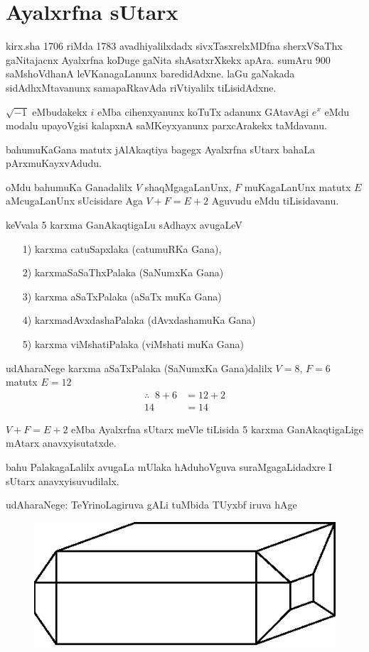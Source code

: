 \chapter{Ayalxrfna sUtarx}

kirx.sha {\rm 1706} riMda {\rm 1783} avadhiyalilxdadx sivxTasxrelxMDfna sherxVSaThx gaNitajacnx Ayalxrfna koDuge gaNita shAsatxrXkekx apAra. sumAru {\rm 900} saMshoVdhanA leVKanagaLanunx baredidAdxne. laGu gaNakada sidAdhxMtavanunx samapaRkavAda riVtiyalilx tiLisidAdxne.

$\sqrt{-1}$ eMbudakekx $i$ eMba cihenxyanunx koTuTx adanunx GAtavAgi $e^x$ eMdu modalu upayoVgisi kalapxnA saMKeyxyanunx parxcArakekx taMdavanu.

bahumuKaGana matutx jAlAkaqtiya bagegx Ayalxrfna sUtarx bahaLa pArxmuKayxvAdudu.

oMdu bahumuKa Ganadalilx $V$ shaqMgagaLanUnx, $F$ muKagaLanUnx matutx $E$ aMcugaLanUnx sUcisidare Aga $V+F=E+2$ Aguvudu eMdu tiLisidavanu. 

keVvala {\rm 5} karxma GanAkaqtigaLu sAdhayx avugaLeV
\begin{enumerate}
\item[{\rm 1)}] karxma catuSapxlaka (catumuRKa Gana),
\item[{\rm 2)}] karxmaSaSaThxPalaka (SaNumxKa Gana)
\item[{\rm 3)}] karxma aSaTxPalaka (aSaTx muKa Gana)
\item[{\rm 4)}] karxmadAvxdashaPalaka (dAvxdashamuKa Gana)
\item[{\rm 5)}] karxma viMshatiPalaka (viMshati muKa Gana)
\end{enumerate}

udAharaNege karxma aSaTxPalaka (SaNumxKa Gana)dalilx \quad $V=8$, \quad $F=6$ matutx $E=12$ 
\begin{align*}
\therefore \;\; 8+6 &=12+2\\
14 &=14
\end{align*}

$V+F=E+2$ eMba Ayalxrfna sUtarx meVle tiLisida {\rm 5} karxma GanAkaqtigaLige mAtarx anavxyisutatxde.

bahu PalakagaLalilx avugaLa mUlaka hAduhoVguva suraMgagaLidadxre I sUtarx anavxyisuvudilalx.

udAharaNege: TeYrinoLagiruva gALi tuMbida TUyxbf iruva hAge
\begin{figure}[H]
\centering
\includegraphics{src/figures/m-147.eps}
\end{figure}

